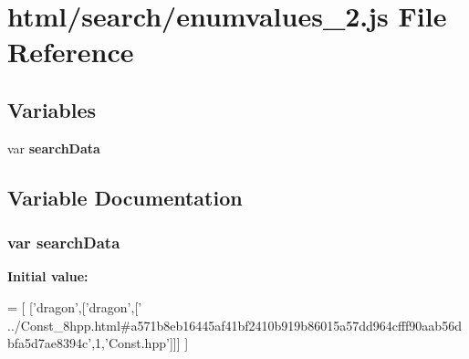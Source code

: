 \section{html/search/enumvalues\-\_\-2.js File Reference}
\label{enumvalues__2_8js}
\subsection*{Variables}
\begin{DoxyCompactItemize}
\item 
var {\bf search\-Data}
\end{DoxyCompactItemize}


\subsection{Variable Documentation}
\subsubsection[{search\-Data}]{\setlength{\rightskip}{0pt plus 5cm}var search\-Data}\label{enumvalues__2_8js_ad01a7523f103d6242ef9b0451861231e}
{\bfseries Initial value\-:}
\begin{DoxyCode}
=
[
  [\textcolor{stringliteral}{'dragon'},[\textcolor{stringliteral}{'dragon'},[\textcolor{stringliteral}{'
      ../Const\_8hpp.html#a571b8eb16445af41bf2410b919b86015a57dd964cfff90aab56dbfa5d7ae8394c'},1,\textcolor{stringliteral}{'Const.hpp'}]]]
]
\end{DoxyCode}
